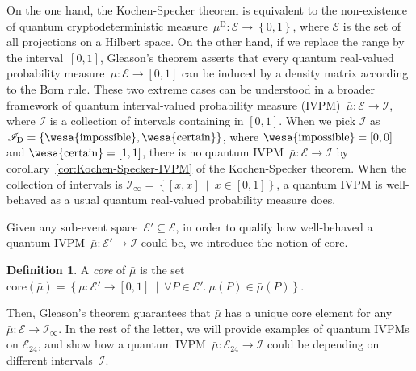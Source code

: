 \documentclass[english,reprint, aps, prl,superscriptaddress, showpacs,
showkeys]{revtex4-1}
\theoremstyle{plain}
\theoremstyle{definition}
\newtheorem{definition}[thm]{Definition}
\newcommand{\events}{\ensuremath{\mathcal{E}}}
\newcommand{\pmeas}{\ensuremath{\mu}}
\newcommand{\imposs}{{\mbox{\wesa{impossible}}}}
\newcommand{\necess}{{\mbox{\wesa{certain}}}}
\newcommand{\set}[2]{\ensuremath{\left\{ {#1}~\middle|~{#2}\right\} }}
\begin{document}
On the one hand, the Kochen-Specker theorem is equivalent to the non-existence
of quantum cryptodeterministic measure~$\mu^{\mathrm{D}}:\events\rightarrow\left\{ 0,1\right\} $,
where $\events$ is the set of all projections on a Hilbert space.
On the other hand, if we replace the range by the interval~$\left[0,1\right]$,
Gleason's theorem asserts that every quantum real-valued probability
measure~$\mu:\events\rightarrow\left[0,1\right]$ can be induced
by a density matrix according to the Born rule. These two extreme
cases can be understood in a broader framework of quantum interval-valued
probability measure (IVPM)~$\bar{\mu}:\events\rightarrow\mathscr{I}$,
where $\mathscr{I}$ is a collection of intervals containing in $\left[0,1\right]$.
When we pick $\mathscr{I}$ as $\mathscr{I}_{\mathrm{D}}=\left\{ \imposs,\necess\right\} $,
where $\imposs=\left[0,0\right]$ and $\necess=\left[1,1\right]$,
there is no quantum IVPM~$\bar{\mu}:\events\rightarrow\mathscr{I}$
by corollary~\ref{cor:Kochen-Specker-IVPM} of the Kochen-Specker
theorem. When the collection of intervals is $\mathscr{I}_{\infty}=\set{\left[x,x\right]}{x\in\left[0,1\right]}$,
a quantum IVPM is well-behaved as a usual quantum real-valued probability
measure does. 

Given any sub-event space~$\events'\subseteq\events$, in order to
qualify how well-behaved a quantum IVPM~$\bar{\mu}:\events'\rightarrow\mathscr{I}$
could be, we introduce the notion of core.

\begin{definition}A \emph{core} of $\bar{\mu}$ is the set $\mathrm{core}\left(\bar{\mu}\right)=\set{\pmeas:\events'\rightarrow[0,1]}{\forall P\in\events'.~\pmeas\left(P\right)\in\bar{\mu}\left(P\right)}$.\end{definition}

\noindent Then, Gleason's theorem guarantees that $\bar{\mu}$ has
a unique core element for any $\bar{\mu}:\events\rightarrow\mathscr{I}_{\infty}$.
In the rest of the letter, we will provide examples of quantum IVPMs
on $\events_{24}$, and show how a quantum IVPM~$\bar{\mu}:\events_{24}\rightarrow\mathscr{I}$
could be depending on different intervals~$\mathscr{I}$.
\end{document}
